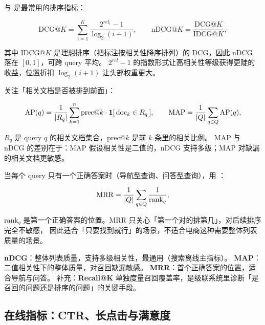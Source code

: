  与  是最常用的排序指标：

\begin{equation}
\text{DCG@}K = \sum_{i=1}^{K} \frac{2^{rel_i} - 1}{\log_2 (i + 1)} ,
\qquad \text{nDCG@}K = \frac{\text{DCG@}K}{\text{IDCG@}K} ,
\label{eq:ndcg}
\end{equation}

其中 IDCG@$K$ 是理想排序（把标注按相关性降序排列）的 DCG，因此 nDCG 落在 $[0, 1]$，可跨 query 平均。
$2^{rel} - 1$ 的指数形式让高相关性等级获得更陡的收益，位置折扣 $\log_2(i+1)$ 让头部权重更大。

 关注「相关文档是否被排到前面」：

\begin{equation}
\text{AP}(q) = \frac{1}{\left\lvert R_q \right\rvert} \sum_{k=1}^{n} \text{prec@}k \cdot \mathbf{1}[\, \text{doc}_k \in R_q \,] ,
\qquad \text{MAP} = \frac{1}{\left\lvert Q \right\rvert} \sum_{q \in Q} \text{AP}(q) ,
\label{eq:map}
\end{equation}

$R_q$ 是 query $q$ 的相关文档集合，prec@$k$ 是前 $k$ 条里的相关比例。
MAP 与 nDCG 的差别在于：MAP 假设相关性是二值的，nDCG 支持多级；MAP 对缺漏的相关文档更敏感。

当每个 query 只有一个正确答案时（导航型查询、问答型查询），用 ：

\begin{equation}
\text{MRR} = \frac{1}{\left\lvert Q \right\rvert} \sum_{q \in Q} \frac{1}{\text{rank}_q} ,
\label{eq:mrr}
\end{equation}

$\text{rank}_q$ 是第一个正确答案的位置。MRR 只关心「第一个对的排第几」，对后续排序完全不敏感，
因此适合「只要找到就行」的场景，不适合电商这种需要整体列表质量的场景。

\begin{formulacard}[三个离线指标各管什么]
\textbf{nDCG}：整体列表质量，支持多级相关性，最通用（搜索离线主指标）。
\textbf{MAP}：二值相关性下的整体质量，对召回缺漏敏感。
\textbf{MRR}：首个正确答案的位置，适合导航与问答。
补充：\textbf{Recall@K} 单独度量召回覆盖率，是级联系统里诊断「是召回的问题还是排序的问题」的关键手段。
\end{formulacard}

\subsection{在线指标：CTR、长点击与满意度}

